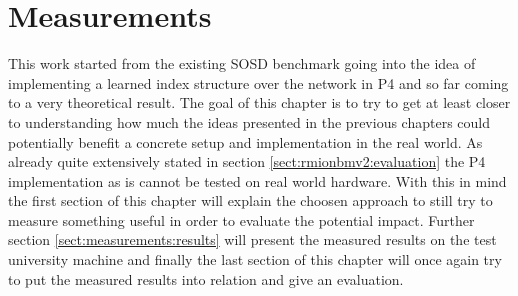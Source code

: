 
\chapter{Measurements}
\label{ch:measurements}
This work started from the existing SOSD benchmark going into the idea of implementing a learned index structure over the network in P4 and so far coming to a very theoretical result. The goal of this chapter is to try to get at least closer to understanding how much the ideas presented in the previous chapters could potentially benefit a concrete setup and implementation in the real world. As already quite extensively stated in section \ref{sect:rmionbmv2:evaluation} the P4 implementation as is cannot be tested on real world hardware. With this in mind the first section of this chapter will explain the choosen approach to still try to measure something useful in order to evaluate the potential impact. Further section \ref{sect:measurements:results} will present the measured results on the test university machine and finally the last section of this chapter will once again try to put the measured results into relation and give an evaluation.

